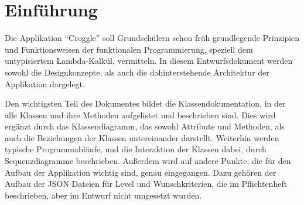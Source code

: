 \chapter{Einführung}

Die Applikation "`Croggle"' soll Grundschülern schon früh grundlegende Prinzipien und Funktionsweisen der funktionalen Programmierung, speziell dem untypisiertem Lambda-Kalkül, vermitteln.
In diesem Entwurfsdokument werden sowohl die Designkonzepte, als auch die dahinterstehende Architektur der Applikation dargelegt.

Den wichtigsten Teil des Dokumentes bildet die Klassendokumentation, in der alle Klassen und ihre Methoden aufgelistet und beschrieben sind.
Dies wird ergänzt durch das Klassendiagramm, das sowohl Attribute und Methoden, als auch die Beziehungen der Klassen untereinander darstellt.
Weiterhin werden typische Programmabläufe, und die Interaktion der Klassen dabei, durch Sequenzdiagramme beschrieben.
Außerdem wird auf andere Punkte, die für den Aufbau der Applikation wichtig sind, genau eingegangen.
Dazu gehören der Aufbau der JSON Dateien für Level und Wunschkriterien, die im Pflichtenheft beschrieben, aber im Entwurf nicht umgesetzt wurden.
